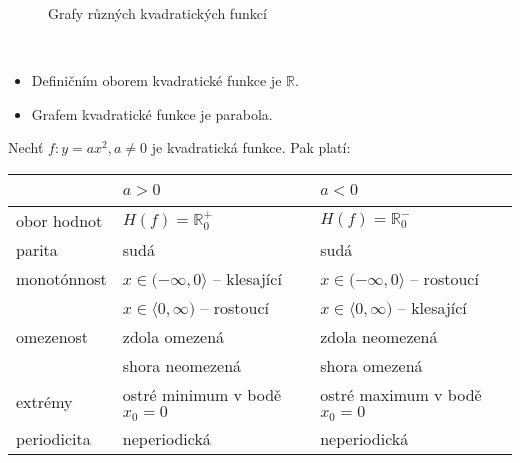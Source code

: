 \begin{figure}[ht!]
  \centering
  \caption{Grafy různých kvadratických funkcí}
\end{figure}

\begin{pozn}\,
  \begin{itemize}
    \item Definičním oborem kvadratické funkce je $\mathbb R$.
    \item Grafem kvadratické funkce je parabola.
  \end{itemize}
\end{pozn}

\begin{veta}
  Nechť $f:y = ax^2, a \neq 0$ je kvadratická funkce. Pak platí:
  \begin{center}
    \begin{tabularx}{\textwidth}{ l | l  l }
        \, & $a>0$ & $a<0$ \\
        \hline
        obor hodnot & $H(f) = \mathbb R^{+}_0$ & $H(f) = \mathbb R^{-}_0$ \\
        parita & sudá & sudá \\
        monotónnost & $x \in (-\infty, 0\rangle$ -- klesající & $x \in (-\infty, 0\rangle$ -- rostoucí \\
        \, & $x \in \langle 0, \infty)$ -- rostoucí & $x \in \langle 0, \infty)$ -- klesající \\
        omezenost & zdola omezená & zdola neomezená \\
        \, & shora neomezená & shora omezená \\
        extrémy &  ostré minimum v bodě $x_0=0$ & ostré maximum v bodě $x_0=0$ \\
        periodicita & neperiodická & neperiodická
    \end{tabularx}
  \end{center}
\end{veta}

